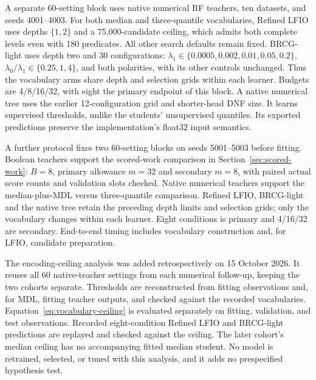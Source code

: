 \documentclass[a4paper,fleqn,review]{cas-sc}
\begin{document}
A separate 60-setting block uses native numerical RF teachers, ten datasets, and seeds 4001--4003. For both median and three-quantile vocabularies, Refined LFIO uses depths $\{1,2\}$ and a 75,000-candidate ceiling, which admits both complete levels even with 180 predicates. All other search defaults remain fixed. BRCG-light uses depth two and 30 configurations: $\lambda_1\in\{0.0005,0.002,0.01,0.05,0.2\}$, $\lambda_0/\lambda_1\in\{0.25,1,4\}$, and both polarities, with its other controls unchanged. Thus the vocabulary arms share depth and selection grids within each learner. Budgets are 4/8/16/32, with eight the primary endpoint of this block. A native numerical tree uses the earlier 12-configuration grid and shorter-head DNF size. It learns supervised thresholds, unlike the students' unsupervised quantiles. Its exported predictions preserve the implementation's float32 input semantics.

A further protocol fixes two 60-setting blocks on seeds 5001--5003 before fitting. Boolean teachers support the scored-work comparison in Section~\ref{sec:scored-work}: $B=8$, primary allowance $m=32$ and secondary $m=8$, with paired actual score counts and validation slots checked. Native numerical teachers support the median-plus-MDL versus three-quantile comparison. Refined LFIO, BRCG-light and the native tree retain the preceding depth limits and selection grids; only the vocabulary changes within each learner. Eight conditions is primary and 4/16/32 are secondary. End-to-end timing includes vocabulary construction and, for LFIO, candidate preparation.

The encoding-ceiling analysis was added retrospectively on 15 October 2026. It reuses all 60 native-teacher settings from each numerical follow-up, keeping the two cohorts separate. Thresholds are reconstructed from fitting observations and, for MDL, fitting teacher outputs, and checked against the recorded vocabularies. Equation~\ref{eq:vocabulary-ceiling} is evaluated separately on fitting, validation, and test observations. Recorded eight-condition Refined LFIO and BRCG-light predictions are replayed and checked against the ceiling. The later cohort's median ceiling has no accompanying fitted median student. No model is retrained, selected, or tuned with this analysis, and it adds no prespecified hypothesis test.
\end{document}
